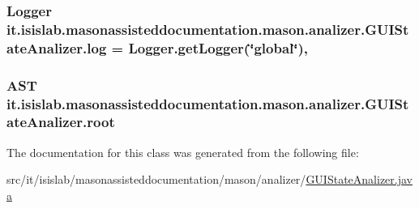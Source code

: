 \hypertarget{classit_1_1isislab_1_1masonassisteddocumentation_1_1mason_1_1analizer_1_1_g_u_i_state_analizer_a4310c36f17a4205ae86067ce7c56b559}{
\subsubsection[{log}]{\setlength{\rightskip}{0pt plus 5cm}Logger it.\-isislab.\-masonassisteddocumentation.\-mason.\-analizer.\-G\-U\-I\-State\-Analizer.\-log = Logger.\-get\-Logger(\char`\"{}global\char`\"{})\hspace{0.3cm}{\ttfamily [static]}, {\ttfamily [private]}}}\label{classit_1_1isislab_1_1masonassisteddocumentation_1_1mason_1_1analizer_1_1_g_u_i_state_analizer_a4310c36f17a4205ae86067ce7c56b559}
\hypertarget{classit_1_1isislab_1_1masonassisteddocumentation_1_1mason_1_1analizer_1_1_g_u_i_state_analizer_a1f105131b365258edb70dfa04b51e87e}{
\subsubsection[{root}]{\setlength{\rightskip}{0pt plus 5cm}A\-S\-T it.\-isislab.\-masonassisteddocumentation.\-mason.\-analizer.\-G\-U\-I\-State\-Analizer.\-root\hspace{0.3cm}{\ttfamily [private]}}}\label{classit_1_1isislab_1_1masonassisteddocumentation_1_1mason_1_1analizer_1_1_g_u_i_state_analizer_a1f105131b365258edb70dfa04b51e87e}


The documentation for this class was generated from the following file\-:\begin{DoxyCompactItemize}
\item 
src/it/isislab/masonassisteddocumentation/mason/analizer/\hyperlink{_g_u_i_state_analizer_8java}{G\-U\-I\-State\-Analizer.\-java}\end{DoxyCompactItemize}
